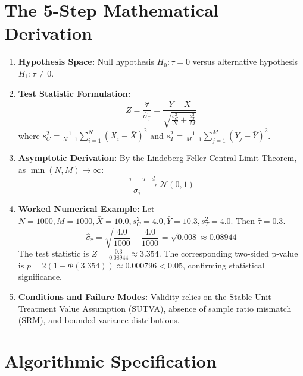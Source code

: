 \documentclass[11pt,a4paper]{article}
\theoremstyle{definition}
\begin{document}
\section{The 5-Step Mathematical Derivation}

\begin{enumerate}
    \item \textbf{Hypothesis Space:} Null hypothesis $H_0: \tau = 0$ versus alternative hypothesis $H_1: \tau \neq 0$.
    \item \textbf{Test Statistic Formulation:}
    \begin{equation}
    Z = \frac{\hat{\tau}}{\hat{\sigma}_{\hat{\tau}}} = \frac{\bar{Y} - \bar{X}}{\sqrt{\frac{s_C^2}{N} + \frac{s_T^2}{M}}}
    \end{equation}
    where $s_C^2 = \frac{1}{N-1} \sum_{i=1}^N (X_i - \bar{X})^2$ and $s_T^2 = \frac{1}{M-1} \sum_{j=1}^M (Y_j - \bar{Y})^2$.
    \item \textbf{Asymptotic Derivation:} By the Lindeberg-Feller Central Limit Theorem, as $\min(N, M) \to \infty$:
    \begin{equation}
    \frac{\hat{\tau} - \tau}{\sigma_{\hat{\tau}}} \xrightarrow{d} \mathcal{N}(0, 1)
    \end{equation}
    \item \textbf{Worked Numerical Example:}
    Let $N = 1000, M = 1000, \bar{X} = 10.0, s_C^2 = 4.0, \bar{Y} = 10.3, s_T^2 = 4.0$.
    Then $\hat{\tau} = 0.3$.
    \begin{equation}
    \hat{\sigma}_{\hat{\tau}} = \sqrt{\frac{4.0}{1000} + \frac{4.0}{1000}} = \sqrt{0.008} \approx 0.08944
    \end{equation}
    The test statistic is $Z = \frac{0.3}{0.08944} \approx 3.354$.
    The corresponding two-sided p-value is $p = 2(1 - \Phi(3.354)) \approx 0.000796 < 0.05$, confirming statistical significance.
    \item \textbf{Conditions and Failure Modes:}
    Validity relies on the Stable Unit Treatment Value Assumption (SUTVA), absence of sample ratio mismatch (SRM), and bounded variance distributions.
\end{enumerate}

\section{Algorithmic Specification}
\end{document}

